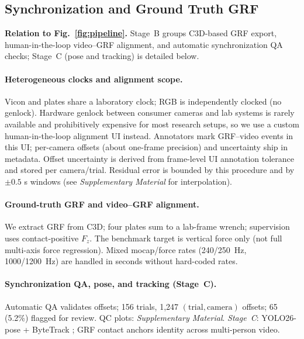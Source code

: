 \documentclass[sigconf,screen]{acmart}
\newcommand{\rateHz}[1]{\mbox{#1~Hz}}
\newcommand{\BadmintonGRFSupplementary}{\emph{Supplementary Material}}
\newcommand{\QAabbrev}{QA}
\begin{document}
\subsection{Synchronization and Ground Truth GRF}
\label{sec:sync_grf}
\noindent\textbf{Relation to Fig.~\ref{fig:pipeline}.} Stage~B groups C3D-based GRF export, human-in-the-loop video--GRF alignment, and automatic synchronization \QAabbrev{} checks; Stage~C (pose and tracking) is detailed below.

\paragraph{Heterogeneous clocks and alignment scope.}
Vicon and plates share a laboratory clock; RGB is independently clocked (no genlock). Hardware genlock between consumer cameras and lab systems is rarely available and prohibitively expensive for most research setups, so we use a custom human-in-the-loop alignment UI instead. Annotators mark GRF--video events in this UI; per-camera offsets (about one-frame precision) and uncertainty ship in metadata. Offset uncertainty is derived from frame-level UI annotation tolerance and stored per camera/trial. Residual error is bounded by this procedure and by \(\pm0.5\) s windows (see \BadmintonGRFSupplementary{} for interpolation).

\paragraph{Ground-truth GRF and video--GRF alignment.}
We extract GRF from C3D; four plates sum to a lab-frame wrench; supervision uses contact-positive \(F_z\). The benchmark target is vertical force only (not full multi-axis force regression). Mixed mocap/force rates (\rateHz{240/250}, \rateHz{1000/1200}) are handled in seconds without hard-coded rates.

\paragraph{Synchronization \QAabbrev{}, pose, and tracking (Stage~C).}
Automatic \QAabbrev{} validates offsets; 156 trials, 1,247 $(\text{trial},\text{camera})$ offsets; 65 (5.2\%) flagged for review. QC plots: \BadmintonGRFSupplementary.
\emph{Stage~C}: YOLO26-pose + ByteTrack \cite{chakrabarty2026YOLO26,zhangByteTrackMultiobjectTracking2022}; GRF contact anchors identity across multi-person video.
\end{document}
